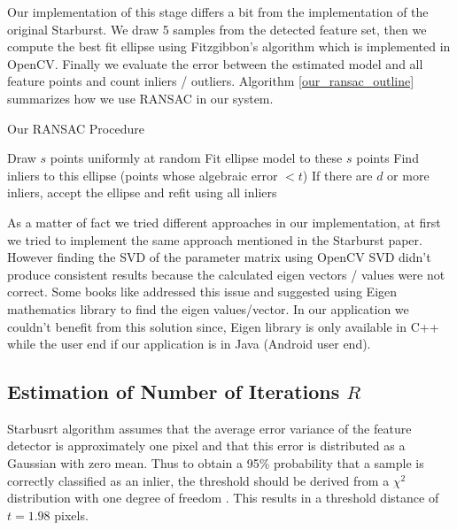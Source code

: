 \begin{our}
Our implementation of this stage differs a bit from the implementation of the original Starburst. We draw 5 samples from the detected feature set, then we compute the best fit ellipse using Fitzgibbon's algorithm \cite{fitzgibbon96} which is implemented in OpenCV. Finally we evaluate the error between the estimated model and all feature points and count inliers / outliers. Algorithm \ref{our_ransac_outline} summarizes how we use RANSAC in our system. \bigskip

\begin{algorithm}
\begin{dBox}
	\caption{Our RANSAC Procedure} \label{our_ransac_outline}
	\begin{algorithmic}[1]
			\State Draw $s$ points uniformly at random
			\State Fit ellipse model to these $s$ points
			\State Find inliers to this ellipse (points whose algebraic error $ < t$)
			\State If there are $d$ or more inliers, accept the ellipse and refit using all inliers	
		\EndWhile	
		\EndProcedure	
	\end{algorithmic}
\end{dBox}	
\end{algorithm}


As a matter of fact we tried different approaches in our implementation, at first we tried to implement the same approach mentioned in the Starburst paper. However finding the SVD of the parameter matrix using OpenCV SVD didn't produce consistent results because the calculated eigen vectors / values were not correct. Some books like \cite{practicalOpenCV} addressed this issue and suggested using Eigen mathematics library \cite{eigenweb} to find the eigen values/vector. In our application we couldn't benefit from this solution since, Eigen library is only available in C++ while the user end if our application is in Java (Android user end).
\end{our}

\subsection{Estimation of Number of Iterations $R$}
Starbusrt algorithm assumes that the average error variance of the feature detector is approximately one pixel and that this error is distributed as a Gaussian with zero mean. Thus to obtain a 95\% probability that a sample is correctly classified as an inlier, the threshold should be derived from a $\chi^{2}$ distribution with one degree of freedom \cite{multipleViewGeom}. This results in a threshold distance of $t = 1.98$ pixels. \bigskip

